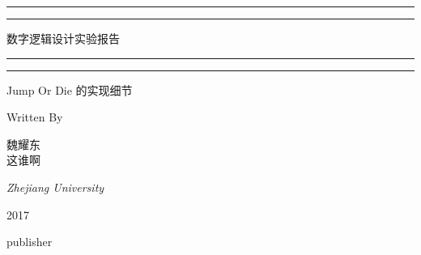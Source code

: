 \documentclass{ctexart}
\begin{document}
\begin{titlepage} %

	\centering %
	
	\scshape %
	
	\vspace*{\baselineskip} %
	
	
	\rule{\textwidth}{1.6pt}\vspace*{-\baselineskip}\vspace*{2pt} %
	\rule{\textwidth}{0.4pt} %
	
	\vspace{0.75\baselineskip} %
	
	{\LARGE 数字逻辑设计实验报告} %
	 
	\vspace{0.75\baselineskip} %
	
	\rule{\textwidth}{0.4pt}\vspace*{-\baselineskip}\vspace{3.2pt} %
	\rule{\textwidth}{1.6pt} %
	
	\vspace{2\baselineskip} %
	
	
     Jump Or Die 的实现细节%
	
	\vspace*{3\baselineskip} %
	
	
	Written By
	
	\vspace{0.5\baselineskip} %
	
	{\scshape\Large 魏耀东 \\ 这谁啊 \\} %
	
	\vspace{0.5\baselineskip} %
	
	\textit{Zhejiang University} %
	
	\vfill %
	
	
	
	\vspace{0.3\baselineskip} %
	
	2017 %
	
	{\large publisher} %
\end{titlepage}
\end{document}
